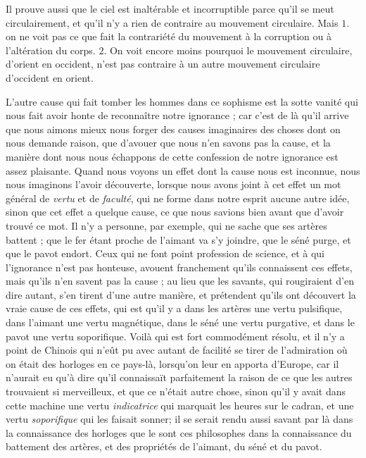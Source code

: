 Il prouve aussi que le ciel est inaltérable et incorruptible parce qu'il se meut circulairement, et qu'il n'y a rien de contraire au mouvement circulaire. Mais $1$. on ne voit pas ce que fait la contrariété du mouvement à la corruption ou à l'altération du corps. $2$. On voit encore moins pourquoi le mouvement circulaire, d'orient en occident, n'est pas contraire à un autre mouvement circulaire d'occident en orient.

L'autre cause qui fait tomber les hommes dans ce sophisme est la sotte vanité qui nous fait avoir honte de reconnaître notre ignorance ; car c'est de là qu'il arrive que nous aimons mieux nous forger des causes imaginaires des choses dont on nous demande raison, que d'avouer que nous n'en savons pas la cause, et la manière dont nous nous échappons de cette confession de notre ignorance est assez plaisante. Quand nous voyons un effet dont la cause nous est inconnue, nous nous imaginons l'avoir découverte, lorsque nous avons joint à cet effet un mot général de \emph{vertu} et de \emph{faculté}, qui ne forme dans notre esprit aucune autre idée, sinon que cet effet a quelque cause, ce que nous savions bien avant que d'avoir trouvé ce mot. Il n'y a personne, par exemple, qui ne sache que ses artères battent ; que le fer étant proche de l'aimant va s'y joindre, que le séné purge, et que le pavot endort. Ceux qui ne font point profession de science, et à qui l'ignorance n'est pas honteuse, avouent franchement qu'ils connaissent ces effets, mais qu'ils n'en savent pas la cause ; au lieu que les savants, qui rougiraient d'en dire autant, s'en tirent d'une autre manière, et prétendent qu'ils ont découvert la vraie cause de ces effets, qui est qu'il y a dans les artères une vertu pulsifique, dans l'aimant une vertu magnétique, dans le séné une vertu purgative, et dans le pavot une vertu soporifique. Voilà qui est fort commodément résolu, et il n'y a point de Chinois qui n'eût pu avec autant de facilité se tirer de l'admiration où on était des horloges en ce pays-là, lorsqu'on leur en apporta d'Europe, car il n'aurait eu qu'à dire qu'il connaissaït parfaitement la raison de ce que les autres trouvaient si merveilleux, et que ce n'était autre chose, sinon qu'il y avait dans cette machine une vertu \emph{indicatrice} qui marquait les heures sur le cadran, et une vertu \emph{soporifique} qui les faisait sonner; il se serait rendu aussi savant par là dans la connaissance des horloges que le sont ces philosophes dans la connaissance du battement des artères, et des propriétés de l'aimant, du séné et du pavot.

